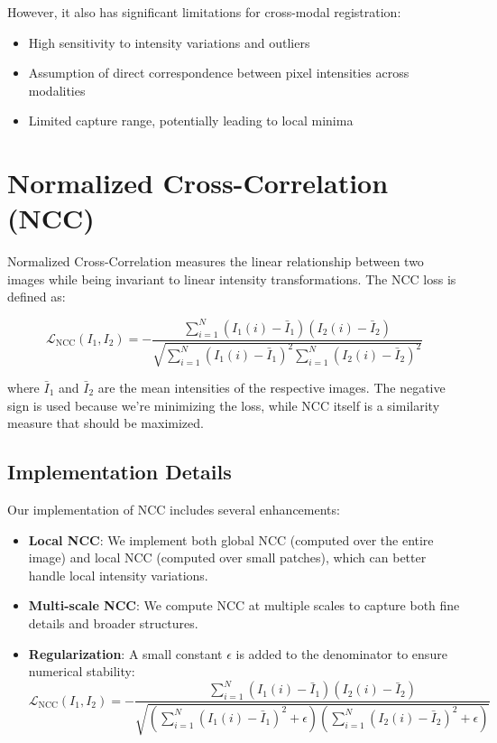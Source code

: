 However, it also has significant limitations for cross-modal registration:
\begin{itemize}
    \item High sensitivity to intensity variations and outliers
    \item Assumption of direct correspondence between pixel intensities across modalities
    \item Limited capture range, potentially leading to local minima
\end{itemize}

\section{Normalized Cross-Correlation (NCC)}

Normalized Cross-Correlation measures the linear relationship between two images while being invariant to linear intensity transformations. The NCC loss is defined as:

\begin{equation}
    \mathcal{L}_{\text{NCC}}(I_1, I_2) = -\frac{\sum_{i=1}^{N} (I_1(i) - \bar{I}_1)(I_2(i) - \bar{I}_2)}{\sqrt{\sum_{i=1}^{N} (I_1(i) - \bar{I}_1)^2 \sum_{i=1}^{N} (I_2(i) - \bar{I}_2)^2}}
\end{equation}

where $\bar{I}_1$ and $\bar{I}_2$ are the mean intensities of the respective images. The negative sign is used because we're minimizing the loss, while NCC itself is a similarity measure that should be maximized.

\subsection{Implementation Details}

Our implementation of NCC includes several enhancements:

\begin{itemize}
    \item \textbf{Local NCC}: We implement both global NCC (computed over the entire image) and local NCC (computed over small patches), which can better handle local intensity variations.
    
    \item \textbf{Multi-scale NCC}: We compute NCC at multiple scales to capture both fine details and broader structures.
    
    \item \textbf{Regularization}: A small constant $\epsilon$ is added to the denominator to ensure numerical stability:
    \begin{equation}
        \mathcal{L}_{\text{NCC}}(I_1, I_2) = -\frac{\sum_{i=1}^{N} (I_1(i) - \bar{I}_1)(I_2(i) - \bar{I}_2)}{\sqrt{(\sum_{i=1}^{N} (I_1(i) - \bar{I}_1)^2 + \epsilon)(\sum_{i=1}^{N} (I_2(i) - \bar{I}_2)^2 + \epsilon)}}
    \end{equation}
\end{itemize}

